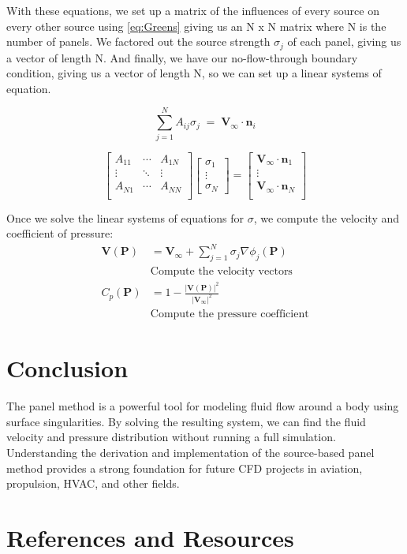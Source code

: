 \documentclass[conf]{new-aiaa} %
\begin{document}
With these equations, we set up a matrix of the influences of every source on every other source using \autoref{eq:Greens} giving us an N x N matrix where N is the number of panels.
We factored out the source strength $\sigma_j$ of each panel, giving us a vector of length N. 
And finally, we have our no-flow-through boundary condition, giving us a vector of length N, so we can set up a linear systems of equation. 

\begin{equation}
	\sum_{j=1}^{N} A_{ij} \sigma_j \;=\; \mathbf{V}_\infty \cdot \mathbf{n}_i
	\label{eq:systems}
\end{equation}

\[
\begin{bmatrix}
A_{11} & \cdots & A_{1N} \\
\vdots & \ddots & \vdots \\
A_{N1} & \cdots & A_{NN} \\
\end{bmatrix}
\begin{bmatrix}
\sigma_1 \\ \vdots \\ \sigma_N
\end{bmatrix}
=
\begin{bmatrix}
\mathbf{V}_\infty \cdot \mathbf{n}_1 \\
\vdots \\
\mathbf{V}_\infty \cdot \mathbf{n}_N \\
\end{bmatrix}
\]

Once we solve the linear systems of equations for $\sigma$, we compute the velocity and coefficient of pressure:
\begin{align}
\mathbf{V}(\mathbf{P}) &= \mathbf{V}_\infty + \sum_{j=1}^{N} \sigma_j \nabla \phi_j (\mathbf{P}) \\
&\text{Compute the velocity vectors} \nonumber \\
C_p(\mathbf{P}) &= 1 - \frac{\lvert \mathbf{V}(\mathbf{P}) \rvert^2}{\lvert \mathbf{V}_\infty \rvert^2} \\
&\text{Compute the pressure coefficient} \nonumber
\end{align}

\section{Conclusion}
The panel method is a powerful tool for modeling fluid flow around a body using surface singularities. 
By solving the resulting system, we can find the fluid velocity and pressure distribution without running a full simulation. 
Understanding the derivation and implementation of the source-based panel method provides a strong foundation for future CFD projects in aviation, propulsion, HVAC, and other fields.
\section{References and Resources}

\nocite{*}


\end{document}
